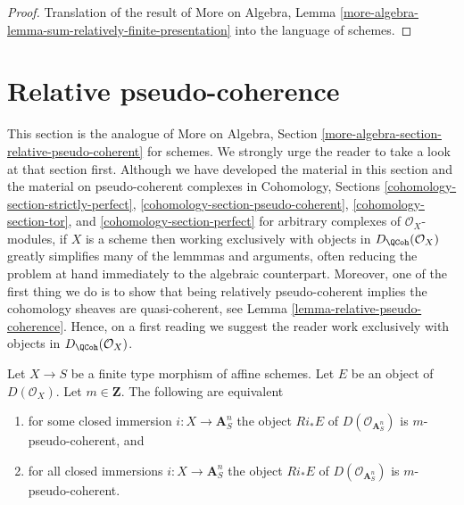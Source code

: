 \begin{proof}
Translation of the result of
More on Algebra, Lemma
\ref{more-algebra-lemma-sum-relatively-finite-presentation}
into the language of schemes.
\end{proof}










\section{Relative pseudo-coherence}
\label{section-relative-pseudo-coherence}

\noindent
This section is the analogue of
More on Algebra, Section \ref{more-algebra-section-relative-pseudo-coherent}
for schemes. We strongly urge the reader to take a look at that
section first. Although we have developed the material in this section
and the material on pseudo-coherent complexes in
Cohomology, Sections \ref{cohomology-section-strictly-perfect},
\ref{cohomology-section-pseudo-coherent},
\ref{cohomology-section-tor}, and
\ref{cohomology-section-perfect}
for arbitrary complexes of $\mathcal{O}_X$-modules, if
$X$ is a scheme then working exclusively with objects in
$D_\QCoh(\mathcal{O}_X)$
greatly simplifies many of the lemmmas and arguments, often
reducing the problem at hand immediately to the algebraic counterpart.
Moreover, one of the first thing we do is to show that
being relatively pseudo-coherent implies the cohomology
sheaves are quasi-coherent, see Lemma \ref{lemma-relative-pseudo-coherence}.
Hence, on a first reading we suggest the reader work exclusively
with objects in $D_\QCoh(\mathcal{O}_X)$.

\begin{lemma}
\label{lemma-relatively-pseudo-coherent}
Let $X \to S$ be a finite type morphism of affine schemes.
Let $E$ be an object of $D(\mathcal{O}_X)$.
Let $m \in \mathbf{Z}$.
The following are equivalent
\begin{enumerate}
\item for some closed immersion $i : X \to \mathbf{A}^n_S$
the object $Ri_*E$ of $D(\mathcal{O}_{\mathbf{A}^n_S})$
is $m$-pseudo-coherent, and
\item for all closed immersions $i : X \to \mathbf{A}^n_S$
the object $Ri_*E$ of $D(\mathcal{O}_{\mathbf{A}^n_S})$
is $m$-pseudo-coherent.
\end{enumerate}
\end{lemma}

